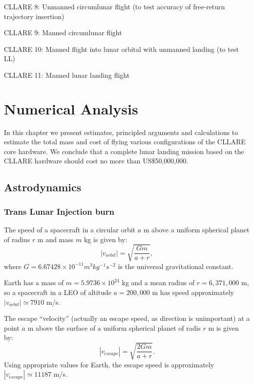 \documentclass{report}
\begin{document}
CLLARE 8: Unmanned circumlunar flight (to test accuracy of free-return trajectory insertion)

CLLARE 9: Manned circumlunar flight

CLLARE 10: Manned flight into lunar orbital with unmanned landing (to test LL)

CLLARE 11: Manned lunar landing flight


\chapter{Numerical Analysis} \label{chap:numeric}

In this chapter we present estimates, principled arguments and calculations to estimate the total mass and cost of flying various configurations of the CLLARE core hardware.  We conclude that a complete lunar landing mission based on the CLLARE hardware should cost no more than US\$50,000,000.

\section{Astrodynamics}

\subsection{Trans Lunar Injection burn} \label{sec:tli}

The speed of a spacecraft in a circular orbit $a$ m above a uniform spherical planet of radius $r$ m and mass $m$ kg is given by:
\begin{equation} \label{eq:v_orbit}
|v_{orbit}| = \sqrt{\frac{Gm}{a+r}},
\end{equation}
where $G = 6.67428 \times 10^{-11} m^3 kg^{-1} s^{-2}$ is the universal gravitational constant.

Earth has a mass of $m = 5.9736 \times 10^{24}$ kg and a mean radius of $r = 6,371,000$ m, so a spacecraft in a LEO of altitude $a = 200,000$ m has speed approximately $|v_{orbit}| \simeq 7910$ m/s.

The escape ``velocity'' (actually an escape speed, as direction is unimportant) at a point $a$ m above the surface of a uniform spherical planet of radis $r$ m is given by:
\begin{equation} \label{eq:v_escape}
|v_{escape}| = \sqrt{\frac{2Gm}{a+r}}.
\end{equation}
Using appropriate values for Earth, the escape speed is approximately $|v_{escape}| \simeq 11187$ m/s.
\end{document}
